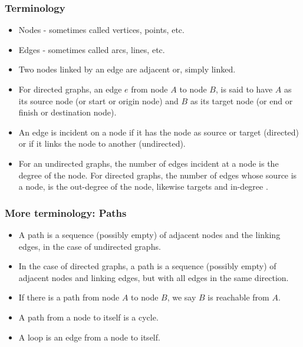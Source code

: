    \begin{frame}[fragile]
\frametitle{Terminology}

\begin{itemize}
\item Nodes - sometimes called vertices, points, etc. 
\item Edges - sometimes called arcs, lines, etc.

\item Two nodes linked by an edge are \color{blue}adjacent \color{black} or, simply \color{blue}linked\color{black}.

\item For directed graphs, an edge $e$ from node $A$ to node $B$, is said to have $A$ as
its \color{blue}source \color{black} node (or start or origin node) and $B$ as its \color{blue}target \color{black} node (or end or finish or destination node).

\item An edge is  \color{blue}incident \color{black} on a node if it has the node as source or target (directed) or
if it links the node to another (undirected).

\item For an undirected graphs, the number of edges incident at a node is the  \color{blue}degree \color{black} of the node.
For directed graphs, the number of edges whose source is a node, is the  \color{blue}out-degree \color{black} of the node, likewise targets and  \color{blue}in-degree \color{black}.
\end{itemize}
\end{frame}

   \begin{frame}[fragile]
\frametitle{More terminology: Paths}

\begin{itemize}
\item A \color{blue}path \color{black} is a sequence (possibly empty) of adjacent nodes and the linking edges, in the case of undirected graphs. 

\item In the case of directed graphs, a \color{blue}path \color{black} is a sequence  (possibly empty) of adjacent nodes 
and linking edges, but with all edges in the same direction. 

\item If there is a path from node $A$ to node $B$, we say $B$ is \color{blue}reachable \color{black} from $A$.

\item A path from a node to itself is a \color{blue}cycle\color{black}.

\item A \color{blue}loop \color{black} is an edge from a node to itself.
\end{itemize}
\end{frame}

